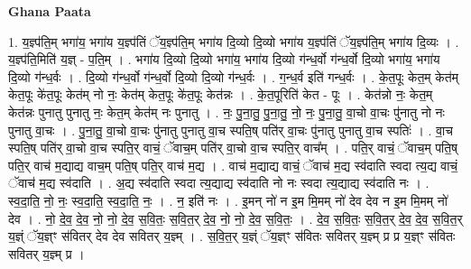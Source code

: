 \documentclass[17pt]{extarticle}
\begin{document}
\textbf{Ghana Paata } \newline

1. य॒ज्ञ्प॑ति॒म् भगा॑य॒ भगा॑य य॒ज्ञ्प॑तिं ॅय॒ज्ञ्प॑ति॒म् भगा॑य दि॒व्यो दि॒व्यो भगा॑य य॒ज्ञ्प॑तिं ॅय॒ज्ञ्प॑ति॒म् भगा॑य दि॒व्यः । . य॒ज्ञ्प॑ति॒मिति॑ य॒ज्ञ् - प॒ति॒म् । . भगा॑य दि॒व्यो दि॒व्यो भगा॑य॒ भगा॑य दि॒व्यो ग॑न्ध॒र्वो ग॑न्ध॒र्वो दि॒व्यो भगा॑य॒ भगा॑य दि॒व्यो ग॑न्ध॒र्वः । . दि॒व्यो ग॑न्ध॒र्वो ग॑न्ध॒र्वो दि॒व्यो दि॒व्यो ग॑न्ध॒र्वः । . ग॒न्ध॒र्व इति॑ गन्ध॒र्वः । . के॒त॒पूः केत॒म् केत॑म् केत॒पूः के॑त॒पूः केत॑म् नो नः॒ केत॑म् केत॒पूः के॑त॒पूः केत॑न्नः । . के॒त॒पूरिति॑ केत - पूः । . केत॑न्नो नः॒ केत॒म् केत॑न्नः पुनातु पुनातु नः॒ केत॒म् केत॑म् नः पुनातु । . नः॒ पु॒ना॒तु॒ पु॒ना॒तु॒ नो॒ नः॒ पु॒ना॒तु॒ वा॒चो वा॒चः पु॑नातु नो नः पुनातु वा॒चः । . पु॒ना॒तु॒ वा॒चो वा॒चः पु॑नातु पुनातु वा॒च स्पति॒ष् पति॑र् वा॒चः पु॑नातु पुनातु वा॒च स्पतिः॑ । . वा॒च स्पति॒ष् पति॑र् वा॒चो वा॒च स्पति॒र् वाचं॒ ॅवाच॒म् पति॑र् वा॒चो वा॒च स्पति॒र् वाच᳚म् । . पति॒र् वाचं॒ ॅवाच॒म् पति॒ष् पति॒र् वाच॑ म॒द्याद्य वाच॒म् पति॒ष् पति॒र् वाच॑ म॒द्य । . वाच॑ म॒द्याद्य वाचं॒ ॅवाच॑ म॒द्य स्व॑दाति स्वदा त्य॒द्य वाचं॒ ॅवाच॑ म॒द्य स्व॑दाति । . अ॒द्य स्व॑दाति स्वदा त्य॒द्याद्य स्व॑दाति नो नः स्वदा त्य॒द्याद्य स्व॑दाति नः । . स्व॒दा॒ति॒ नो॒ नः॒ स्व॒दा॒ति॒ स्व॒दा॒ति॒ नः॒ । . न॒ इति॑ नः । . इ॒मन् नो॑ न इ॒म मि॒मम् नो॑ देव देव न इ॒म मि॒मम् नो॑ देव । . नो॒ दे॒व॒ दे॒व॒ नो॒ नो॒ दे॒व॒ स॒वि॒तः॒ स॒वि॒त॒र् दे॒व॒ नो॒ नो॒ दे॒व॒ स॒वि॒तः॒ । . दे॒व॒ स॒वि॒तः॒ स॒वि॒त॒र् दे॒व॒ दे॒व॒ स॒वि॒त॒र् य॒ज्ञ्ं ॅय॒ज्ञ्ꣳ स॑वितर् देव देव सवितर् य॒ज्ञ्म् । . स॒वि॒त॒र् य॒ज्ञ्ं ॅय॒ज्ञ्ꣳ स॑वितः सवितर् य॒ज्ञ्म् प्र प्र य॒ज्ञ्ꣳ स॑वितः सवितर् य॒ज्ञ्म् प्र । \newline
\end{document}
